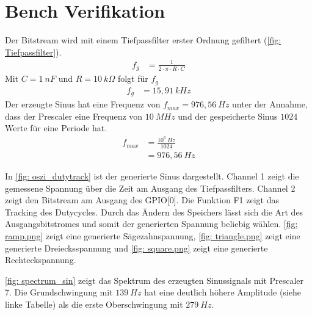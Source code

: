 \documentclass[./\jobname.tex]{subfiles}
\begin{document}
\section{Bench Verifikation}
%
Der Bitstream wird mit einem Tiefpassfilter erster Ordnung gefiltert (\autoref{fig: Tiefpassfilter}).
%
\begin{align}
f_{g}&= \frac{1}{2 \cdot \pi \cdot R \cdot C}
\end{align}
%
Mit \(C=1~nF\) und \(R=10~k\Omega\) folgt für \(f_{g}\)
%
\begin{align}
	f_{g}&= 15,91~kHz
\end{align}
%
Der erzeugte Sinus hat eine Frequenz von \(f_{max}=976,56~Hz\) unter der Annahme, dass der Prescaler eine Frequenz von \(10~MHz\) und der gespeicherte Sinus \(1024\) Werte für eine Periode hat.
%
\begin{align}
f_{max}&=\frac{10^{6}~Hz}{1024}\\
&=976,56~Hz
\end{align}
%
\def\bildA{false}
\begin{figure}[H]
	\centering
	\noindent{}
	\label{fig: Tiefpassfilter}
\end{figure}
%
In \autoref{fig: oszi_dutytrack} ist der generierte Sinus dargestellt. Channel 1 zeigt die gemessene Spannung über die Zeit am Ausgang des Tiefpassfilters. Channel 2 zeigt den Bitstream am Ausgang des GPIO[0]. Die Funktion F1 zeigt das Tracking des Dutycycles. Durch das Ändern des Speichers lässt sich die Art des Ausgangsbitstromes und somit der generierten Spannung beliebig wählen. \autoref{fig: ramp.png} zeigt eine generierte Sägezahnspannung, \autoref{fig: triangle.png} zeigt eine generierte Dreiecksspannung und \autoref{fig: square.png} zeigt eine generierte Rechteckspannung.
%
\begin{figure}[H]
	\centering
	\noindent{}
	\label{fig: oszi_dutytrack}
\end{figure}
%
\autoref{fig: spectrum_sin} zeigt das Spektrum des erzeugten Sinussignals mit Prescaler 7. Die Grundschwingung mit \(139~Hz\) hat eine deutlich höhere Amplitude (siehe linke Tabelle) als die erste Oberschwingung mit \(279~Hz\).
\end{document}
